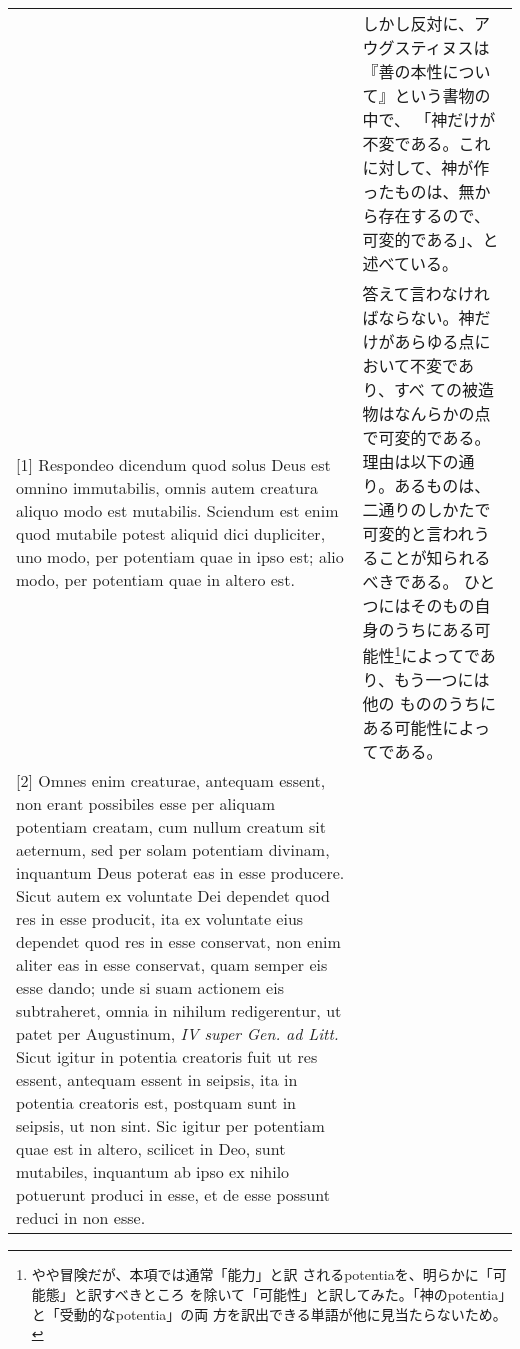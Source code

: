 \documentclass[10pt]{jsarticle} %
\begin{document}
\begin{longtable}{p{21em}p{21em}}
&

しかし反対に、アウグスティヌスは『善の本性について』という書物の中で、
「神だけが不変である。これに対して、神が作ったものは、無から存在するので、
可変的である」、と述べている。


\\


[1] Respondeo dicendum quod solus Deus est omnino immutabilis,
 omnis autem creatura aliquo modo est mutabilis. 
Sciendum est enim quod mutabile potest aliquid dici dupliciter, uno
modo, per potentiam quae in ipso est; alio modo, per potentiam quae in
altero est.


&

答えて言わなければならない。神だけがあらゆる点において不変であり、すべ
ての被造物はなんらかの点で可変的である。理由は以下の通り。あるものは、
二通りのしかたで可変的と言われうることが知られるべきである。
ひとつにはそのもの自身のうちにある可能性\footnote{やや冒険だが、本項では通常「能力」と訳
 されるpotentiaを、明らかに「可能態」と訳すべきところ
 を除いて「可能性」と訳してみた。「神のpotentia」と「受動的なpotentia」の両
 方を訳出できる単語が他に見当たらないため。}によってであり、もう一つには他の
もののうちにある可能性によってである。

\\

[2] Omnes enim creaturae, antequam essent, non erant possibiles esse
per aliquam potentiam creatam, cum nullum creatum sit aeternum, sed
per solam potentiam divinam, inquantum Deus poterat eas in esse
producere. Sicut autem ex voluntate Dei dependet quod res in esse
producit, ita ex voluntate eius dependet quod res in esse conservat,
non enim aliter eas in esse conservat, quam semper eis esse dando;
unde si suam actionem eis subtraheret, omnia in nihilum redigerentur,
ut patet per Augustinum, {\it IV super Gen. ad Litt.} Sicut igitur in
potentia creatoris fuit ut res essent, antequam essent in seipsis, ita
in potentia creatoris est, postquam sunt in seipsis, ut non sint. Sic
igitur per potentiam quae est in altero, scilicet in Deo, sunt
mutabiles, inquantum ab ipso ex nihilo potuerunt produci in esse, et
de esse possunt reduci in non esse.

&


\end{longtable}
\end{document}
